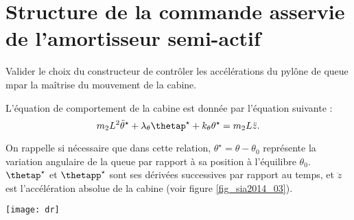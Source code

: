 

\section{Structure de la commande asservie de l'amortisseur semi-actif}
\begin{obj}
Valider le choix du constructeur de contrôler les accélérations du pylône de queue mpar la maîtrise du mouvement de la cabine.
\end{obj}

L'équation de comportement de la cabine est donnée par l'équation suivante : 
$$
m_2 L^2 \ddot{\theta}^{\star} + \lambda_{\theta} \thetap^{\star} + k_{\theta}\theta^{\star} = m_2 L \ddot{z}.
$$

On rappelle si nécessaire que dans cette relation, $\theta^{\star} = \theta - \theta_0$ représente la variation angulaire de la queue par rapport à sa position à l’équilibre $\theta_0$. $\thetap^{\star}$ et $\thetapp^{\star}$
sont ses dérivées successives par rapport au temps, et $\ddot{z}$ est l’accélération absolue de la cabine (voir figure \ref{fig_sia2014_03}).





\begin{center}
\texttt{[image: dr]}
\end{center}
